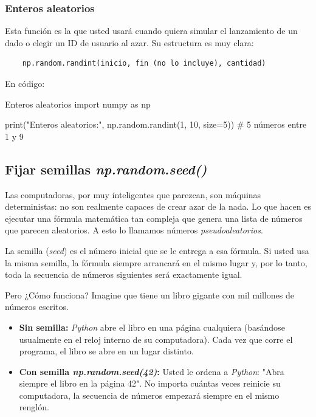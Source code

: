 \subsubsection{Enteros aleatorios}

Esta función es la que usted usará cuando quiera simular el lanzamiento de un dado o elegir un ID de usuario al azar. Su estructura es muy clara:
\begin{verbatim}
    np.random.randint(inicio, fin (no lo incluye), cantidad)
\end{verbatim}

En código:
\begin{pycode}{Enteros aleatorios}
    import numpy as np
    
    print("Enteros aleatorios:", np.random.randint(1, 10, size=5))
    # 5 números entre 1 y 9
\end{pycode}


\subsection{Fijar semillas \textit{np.random.seed()}}

Las computadoras, por muy inteligentes que parezcan, son máquinas deterministas: no son realmente capaces de crear azar de la nada. Lo que hacen es ejecutar una fórmula matemática tan compleja que genera una lista de números que parecen aleatorios. A esto lo llamamos números \textit{pseudoaleatorios}.

La semilla (\textit{seed}) es el número inicial que se le entrega a esa fórmula. Si usted usa la misma semilla, la fórmula siempre arrancará en el mismo lugar y, por lo tanto, toda la secuencia de números siguientes será exactamente igual.

Pero ¿Cómo funciona? Imagine que tiene un libro gigante con mil millones de números escritos.
\begin{itemize}
\item \textbf{Sin semilla:} \textit{Python} abre el libro en una página cualquiera (basándose usualmente en el reloj interno de su computadora). Cada vez que corre el programa, el libro se abre en un lugar distinto.
\item \textbf{Con semilla \textit{np.random.seed(42)}:} Usted le ordena a \textit{Python}: "Abra siempre el libro en la página 42". No importa cuántas veces reinicie su computadora, la secuencia de números empezará siempre en el mismo renglón.
\end{itemize}

